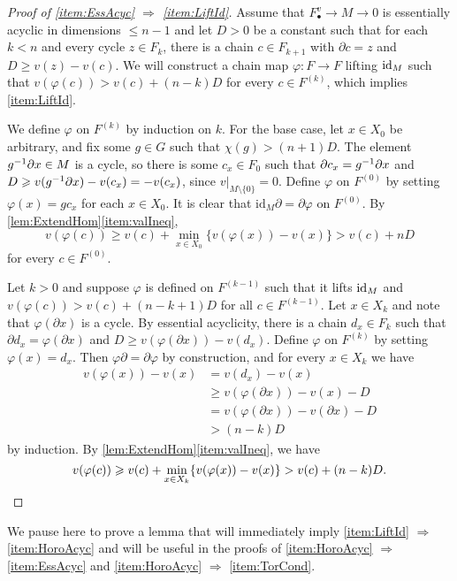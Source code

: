 \documentclass[11pt, letterpaper]{amsart}
\begin{document}
\begin{proof}[Proof of \ref{item:EssAcyc} $\Longrightarrow$ \ref{item:LiftId}]
Assume that $F_\bullet^v \longrightarrow M \longrightarrow 0$ is essentially acyclic in dimensions $\leqslant n-1$ and let $D > 0$ be a constant such that for each $k < n$ and every cycle $z \in F_k$, there is a chain $c \in F_{k+1}$ with $\partial c = z$ and $D \geqslant v(z) - v(c)$. 
We will construct a chain map $\varphi \colon F \longrightarrow F$ lifting $\operatorname{id}_M$ such that $v(\varphi(c)) > v(c) + (n - k)D$ for every $c \in F^{(k)}$, which implies \ref{item:LiftId}.

We define $\varphi$ on $F^{(k)}$ by induction on $k$. For the base case, let $x \in X_0$ be arbitrary, and fix some $g \in G$ such that $\chi(g) > (n+1)D$. The element $g^{-1}\partial x \in M$ is a cycle, so there is some $c_x \in F_0$ such that $\partial c_x = g^{-1} \partial x$ and $D \geqslant v(g^{-1} \partial x) - v(c_x) = -v(c_x)$, since $v|_{M \setminus\{0\}} = 0$. Define $\varphi$ on $F^{(0)}$ by setting $\varphi(x) = gc_x$ for each $x \in X_0$. It is  clear that $\mathrm{id}_M  \partial = \partial  \varphi$ on $F^{(0)}$. By \cref{lem:ExtendHom}\ref{item:valIneq},
\[
v(\varphi(c)) \geqslant v(c) + \min_{x \in X_0} \{v(\varphi(x)) - v(x)\} > v(c) + nD
\]
for every $c \in F^{(0)}$.

Let $k > 0$ and suppose $\varphi$ is defined on $F^{(k-1)}$ such that it lifts $\operatorname{id}_M$ and $v(\varphi(c)) > v(c) + (n - k + 1)D$ for all $c \in F^{(k-1)}$. Let $x \in X_k$ and note that $\varphi(\partial x)$ is a cycle. By essential acyclicity, there is a chain $d_x \in F_k$ such that $\partial d_x = \varphi(\partial x)$ and $D \geqslant v(\varphi(\partial x)) - v(d_x)$. Define $\varphi$ on $F^{(k)}$ by setting $\varphi(x) = d_x$. Then $\varphi \partial = \partial \varphi$ by construction, and for every $x \in X_k$ we have
\begin{align*}
v(\varphi(x)) - v(x) &= v(d_x) - v(x) \\
    &\geqslant v(\varphi(\partial x)) - v(x) - D \\
    &= v(\varphi(\partial x)) - v(\partial x) - D \\
    &> (n-k)D
\end{align*}
by induction. By \cref{lem:ExtendHom}\ref{item:valIneq}, we have
\[
v(\varphi(c)) \geqslant v(c) + \min_{x \in X_k} \{ v(\varphi(x)) - v(x) \} > v(c) + (n-k)D. \qedhere
\]
\end{proof}


We pause here to prove a lemma that will immediately imply \ref{item:LiftId} $\Longrightarrow$ \ref{item:HoroAcyc} and will be useful in the proofs of \ref{item:HoroAcyc} $\Longrightarrow$ \ref{item:EssAcyc} and \ref{item:HoroAcyc} $\Longrightarrow$ \ref{item:TorCond}. 
\end{document}
